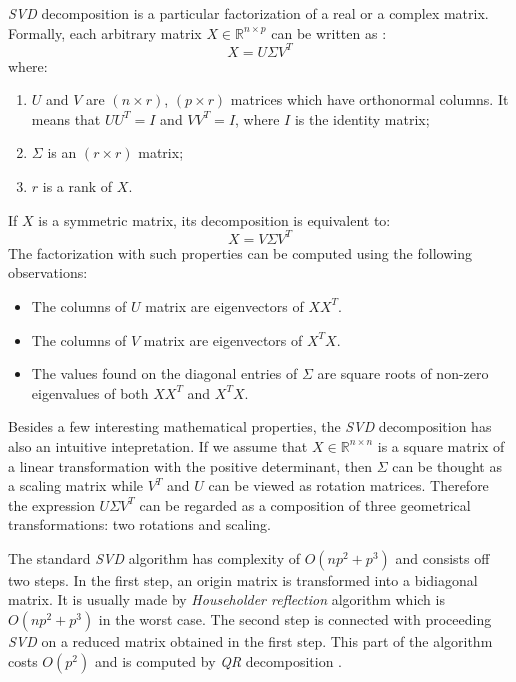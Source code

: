 \begin{appendices}
\textit{SVD} decomposition is a particular factorization of a real or a complex matrix. Formally, each arbitrary matrix $X \in \mathbb{R}^{n \times p}$ can be written as \cite{Jolliffe}:
\begin{equation}
    X=U\Sigma{V^T}
\end{equation}
where:
\begin{enumerate}
    \item $U$ and $V$ are $(n \times r)$, $(p \times r)$ matrices which have orthonormal columns. It means that $UU^T=I$ and $VV^T=I$, where $I$ is the identity matrix;
    \item $\Sigma$ is an $(r \times r)$ matrix;
    \item $r$ is a rank of $X$.
\end{enumerate}
If $X$ is a symmetric matrix, its decomposition is equivalent to:
\begin{equation}
    X=V\Sigma{V^T}
\end{equation}
The factorization with such properties can be computed using the following observations:
\begin{itemize}
    \item The columns of $U$ matrix are eigenvectors of $XX^T$.
    \item The columns of $V$ matrix are eigenvectors of $X^TX$.
    \item The values found on the diagonal entries of $\Sigma$ are square roots of non-zero eigenvalues of both $XX^T$ and $X^TX$.
\end{itemize}

Besides a few interesting mathematical properties, the \textit{SVD} decomposition has also an intuitive intepretation. If we assume that $X \in \mathbb{R}^{n \times n}$ is a square matrix of a linear transformation with the positive determinant, then $\Sigma$ can be thought as a scaling matrix while $V^T$ and $U$ can be viewed as rotation matrices. Therefore the expression $U\Sigma{V^T}$ can be regarded as a composition of three geometrical transformations: two rotations and scaling\cite{SVD}.

The standard \textit{SVD} algorithm has complexity of $O(np^2+p^3)$ and consists off two steps. In the first step, an origin matrix is transformed into a bidiagonal matrix. It is usually made by \textit{Householder reflection} algorithm which is $O(np^2+p^3)$ in the worst case. The second step is connected with proceeding \textit{SVD} on a reduced matrix obtained in the first step. This part of the algorithm costs $O(p^2)$ and is computed by \textit{QR} decomposition \cite{SVD}. 


\end{appendices}
